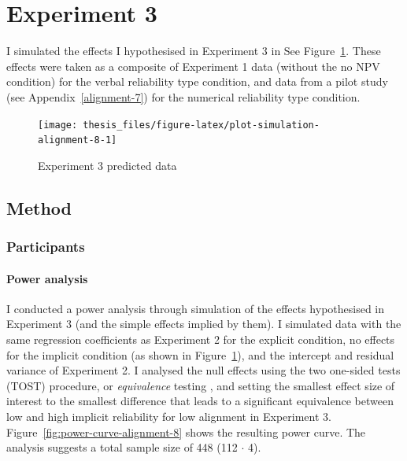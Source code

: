 \documentclass[a4paper, nobind, dvipsnames]{templates/ociamthesis}
\theoremstyle{definition}
\theoremstyle{definition}
\theoremstyle{definition}
\theoremstyle{definition}
\theoremstyle{remark}
\begin{document}
\hypertarget{alignment-8-appendix}{%
\section{Experiment 3}\label{alignment-8-appendix}}

I simulated the effects I hypothesised in Experiment 3 in See
Figure~\ref{fig:plot-simulation-alignment-8}. These effects were taken as a
composite of Experiment 1 data (without the no NPV condition) for the verbal
reliability type condition, and data from a pilot study (see
Appendix~\ref{alignment-7}) for the numerical reliability type condition.



\begin{figure}
\texttt{[image: thesis\_files/figure-latex/plot-simulation-alignment-8-1]} \caption{Experiment 3 predicted data}\label{fig:plot-simulation-alignment-8}
\end{figure}

\hypertarget{method-12}{%
\subsection{Method}\label{method-12}}

\hypertarget{participants-11}{%
\subsubsection{Participants}\label{participants-11}}

\hypertarget{power-analysis-alignment-8}{%
\paragraph{Power analysis}\label{power-analysis-alignment-8}}

I conducted a power analysis through simulation of the effects hypothesised in
Experiment 3 (and the simple effects implied by them). I simulated
data with the same regression coefficients as Experiment 2 for the explicit
condition, no effects for the implicit condition (as shown in
Figure~\ref{fig:plot-simulation-alignment-8}), and the intercept and residual
variance of Experiment 2. I analysed the null effects using the two one-sided
tests (TOST) procedure, or \emph{equivalence} testing \autocite{lakens2018}, and setting the
smallest effect size of interest to the smallest difference that leads to a
significant equivalence between low and high implicit reliability for low
alignment in Experiment 3. Figure~\ref{fig:power-curve-alignment-8} shows the
resulting power curve. The analysis suggests a total sample size of
448 (112 \(\cdot\) 4).
\end{document}
